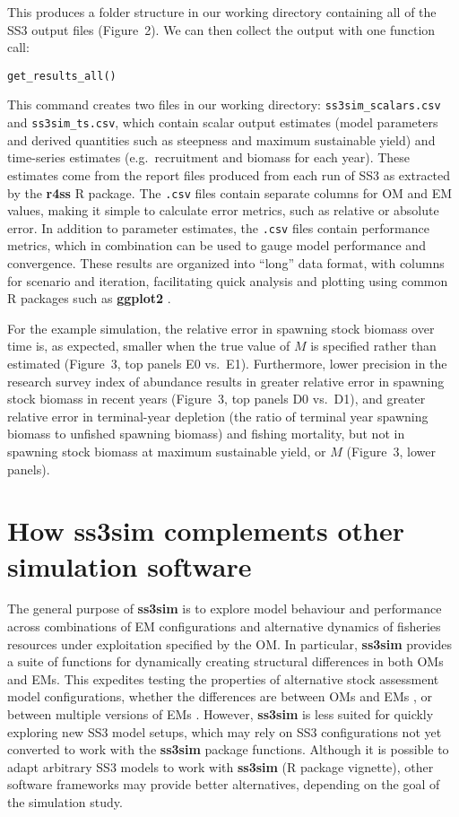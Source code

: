 \documentclass[10pt]{article}
\begin{document}
\noindent
This produces a folder structure in our working directory containing all of the
SS3 output files (Figure~2). We can then collect the output with one
function call:

\begin{verbatim}
get_results_all()
\end{verbatim}

\noindent
This command creates two files in our working directory:
\texttt{ss3sim\_scalars.csv} and \texttt{ss3sim\_ts.csv}, which contain scalar
output estimates (model parameters and derived quantities such as
steepness and maximum sustainable yield) and time-series estimates
(e.g.~recruitment and biomass for each year). These estimates come from the
report files produced from each run of SS3 as extracted by the \textbf{r4ss}
\textsf{R} package. The \texttt{.csv} files contain separate columns for OM and
EM values, making it simple to calculate error metrics, such as relative or
absolute error. In addition to parameter estimates, the \texttt{.csv} files
contain performance metrics, which in combination can be used to gauge model
performance and convergence. These results are organized into ``long'' data
format, with columns for scenario and iteration, facilitating quick analysis
and plotting using common \textsf{R} packages such as \textbf{ggplot2}
\cite{wickham2009}.

For the example simulation, the relative error in spawning stock biomass over
time is, as expected, smaller when the true value of $M$ is specified rather
than estimated (Figure~3, top panels E0 vs.~E1). Furthermore, lower precision
in the research survey index of abundance results in greater relative error in
spawning stock biomass in recent years (Figure~3, top panels D0 vs.~D1), and
greater relative error in terminal-year depletion (the ratio of terminal year
spawning biomass to unfished spawning biomass) and fishing mortality, but not
in spawning stock biomass at maximum sustainable yield, or $M$ (Figure~3, lower
panels).

\section*{How ss3sim complements other simulation software}

The general purpose of \textbf{ss3sim} is to explore model behaviour and
performance across combinations of EM configurations and alternative dynamics
of fisheries resources under exploitation specified by the OM. In particular,
\textbf{ss3sim} provides a suite of functions for dynamically creating
structural differences in both OMs and EMs. This expedites testing the
properties of alternative stock assessment model configurations, whether the
differences are between OMs and EMs \cite{johnson2014}, or between multiple
versions of EMs \cite{ono2014}. However, \textbf{ss3sim} is less suited for
quickly exploring new SS3 model setups, which may rely on SS3 configurations
not yet converted to work with the \textbf{ss3sim} package functions.
Although it is possible to adapt arbitrary SS3 models to work with
\textbf{ss3sim} (\textsf{R} package vignette), other software frameworks may provide better
alternatives, depending on the goal of the simulation study.
\end{document}
